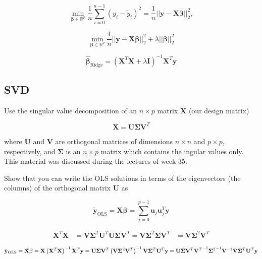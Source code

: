 \documentclass[twoside,11pt]{report}
\begin{document}
$$
{\displaystyle \min_{\mathbf{\beta}\in
{\mathbb{R}}^{p}}}\frac{1}{n}\sum_{i=0}^{n-1}\left(y_i-\tilde{y}_i\right)^2=\frac{1}{n}\vert\vert \mathbf{y}-\mathbf{X}\mathbf{\beta}\vert\vert_2^2,
$$




$$
{\displaystyle \min_{\mathbf{\beta}\in
{\mathbb{R}}^{p}}}\frac{1}{n}\vert\vert \mathbf{y}-\mathbf{X}\mathbf{\beta}\vert\vert_2^2+\lambda\vert\vert \mathbf{\beta}\vert\vert_2^2
$$









$$
\hat{\mathbf{\beta}}_{\mathrm{Ridge}} = \left(\mathbf{X}^T\mathbf{X}+\lambda\mathbf{I}\right)^{-1}\mathbf{X}^T\mathbf{y}
$$





%
\subsection*{SVD}
\label{app:svd}



Use the singular value decomposition of an $n\times p$ matrix $\mathbf{X}$ (our design matrix)

$$
\mathbf{X}=\mathbf{U}\mathbf{\Sigma}\mathbf{V}^T
$$


where $\mathbf{U}$ and $\mathbf{V}$ are orthogonal matrices of dimensions
$n\times n$ and $p\times p$, respectively, and $\mathbf{\Sigma}$ is an
$n\times p$ matrix which contains the ingular values only. This material was discussed during the lectures of week 35.

Show that you can write the 
OLS solutions in terms of the eigenvectors (the columns) of the orthogonal matrix  $\mathbf{U}$ as


$$
\tilde{\mathbf{y}}_{\mathrm{OLS}}=\mathbf{X}\mathbf{\beta}  = \sum_{j=0}^{p-1}\mathbf{u}_j\mathbf{u}_j^T\mathbf{y}
$$


\begin{align*}
    \mathbf{X}^T\mathbf{X} & = \mathbf{V}\mathbf{\Sigma}^T\mathbf{U}^T\mathbf{U}\mathbf{\Sigma}\mathbf{V}^T = \mathbf{V}\mathbf{\Sigma}^T\mathbf{\Sigma}\mathbf{V}^T 
               & = \mathbf{V}\mathbf{\Sigma}^2\mathbf{V}^T
\end{align*}

$$
\tilde{\mathbf{y}}_{\mathrm{OLS}} = \mathbf{X}\mathbf{\beta} = \mathbf{X} \left(\mathbf{X}^T \mathbf{X}\right)^{-1} \mathbf{X}^T \mathbf{y}
\\ = \mathbf{U}\mathbf{\Sigma}\mathbf{V}^T \left( \mathbf{V}\mathbf{\Sigma}^2\mathbf{V}^T \right)^{-1} \mathbf{V}\mathbf{\Sigma}^T\mathbf{U}^T \mathbf{y}
\\ = \mathbf{U}\mathbf{\Sigma}\mathbf{V}^T {\mathbf{V}^T}^{-1} {\mathbf{\Sigma}^2}^{-1} \mathbf{V}^{-1}  \mathbf{V}\mathbf{\Sigma}^T\mathbf{U}^T \mathbf{y}
$$
\end{document}
